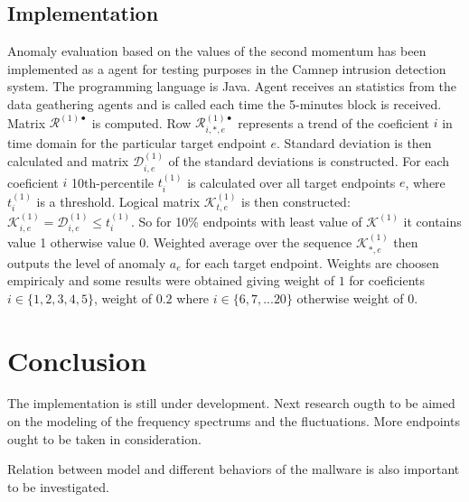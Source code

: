 \documentclass[a4paper]{IEEEtran}
\begin{document}
\subsection{Implementation}
Anomaly evaluation based on the values of the second momentum has been implemented 
as a agent for testing purposes in the Camnep intrusion detection system. The programming 
language is Java. Agent receives an statistics from the data geathering agents and is called 
each time the 5-minutes block is received. Matrix $\mathcal{R}^{(1)\bullet}$ is computed. 
Row $\mathcal{R}^{(1)\bullet}_{i,*,e}$ represents a trend of the coeficient $i$ in time domain 
for the particular target endpoint $e$. Standard deviation is then calculated and matrix
$\mathcal{D}^{(1)}_{i,e}$ of the standard deviations is constructed.
For each coeficient $i$ 10th-percentile $t^{(1)}_i$ is calculated over all target endpoints $e$, 
where $t^{(1)}_i$ is a threshold.
Logical matrix $\mathcal{K}^{(1)}_{t,e}$ is then constructed: 
$\mathcal{K}^{(1)}_{i,e} = \mathcal{D}^{(1)}_{i,e} \le t^{(1)}_i $. 
So for 10\% endpoints with least value of $\mathcal{K}^{(1)}$
it contains value 1 otherwise value 0. Weighted average over the sequence $\mathcal{K}^{(1)}_{*,e}$
then outputs the level of anomaly $a_e$ for each target endpoint. Weights are choosen empiricaly
and some results were obtained giving weight of $1$ for coeficients $i \in \{1,2,3,4,5\}$, weight of $0.2$
where $i\in \{6,7,... 20\}$ otherwise weight of $0$.

\section{Conclusion}
The implementation is still under development. Next research ougth to be aimed on the modeling of the
frequency spectrums and the fluctuations. More endpoints ought to be taken in consideration. 

Relation between model and different behaviors of the mallware is also important to be investigated.



\clearpage
\onecolumn
\appendix
\end{document}
